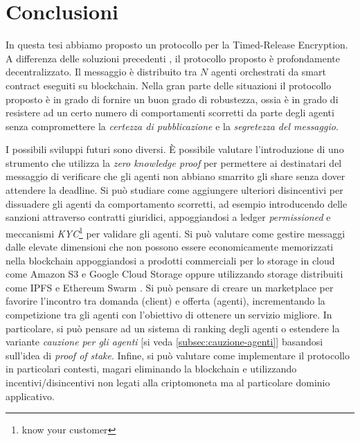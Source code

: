 \chapter{Conclusioni}
In questa tesi abbiamo proposto un protocollo per la Timed-Release Encryption. A differenza delle soluzioni precedenti \cite{time-capsule-signature, 10.1007/11602897_25, 10.1007/3-540-48910-X_6,
	10.1007/11889663_17, 10.1007/978-3-642-15317-4_1, 10.1145/1330332.1330336, chalkias2007improved},
il protocollo proposto è profondamente decentralizzato. Il messaggio è distribuito tra $ N $ agenti orchestrati da smart contract eseguiti su blockchain. Nella gran parte delle situazioni il protocollo proposto è in grado di fornire un buon grado di robustezza, ossia è in grado di resistere ad un certo numero di comportamenti scorretti da parte degli agenti senza compromettere la \textit{certezza di pubblicazione} e la \textit{segretezza del messaggio}.

I possibili sviluppi futuri sono diversi. È possibile valutare l'introduzione di uno strumento che utilizza la \textit{zero knowledge proof} per permettere ai destinatari del messaggio di verificare che gli agenti non abbiano smarrito gli share senza dover attendere la deadline. Si può studiare come aggiungere ulteriori disincentivi per dissuadere gli agenti da comportamento scorretti, ad esempio introducendo delle sanzioni attraverso contratti giuridici, appoggiandosi a ledger \textit{permissioned} e meccanismi \textit{KYC}\footnote{know your customer} per validare gli agenti. Si può valutare come gestire messaggi dalle elevate dimensioni che non possono essere economicamente memorizzati nella \mbox{blockchain} appoggiandosi a prodotti commerciali per lo storage in cloud come Amazon S3 \cite{amazon-s3} e Google Cloud Storage \cite{gcs} oppure utilizzando storage distribuiti come IPFS \cite{ipfs} e Ethereum Swarm \cite{ethereum-swarm}. Si può pensare di creare un marketplace per favorire l'incontro tra domanda (client) e offerta (agenti), incrementando la competizione tra gli agenti con l'obiettivo di ottenere un servizio migliore. In particolare, si può pensare ad un sistema di ranking degli agenti o estendere la variante \textit{cauzione per gli agenti} [si veda \ref{subsec:cauzione-agenti}] basandosi sull'idea di \textit{proof of stake}. Infine, si può valutare come implementare il protocollo in particolari contesti, magari eliminando la blockchain e utilizzando incentivi/disincentivi non legati alla criptomoneta ma al particolare dominio applicativo.